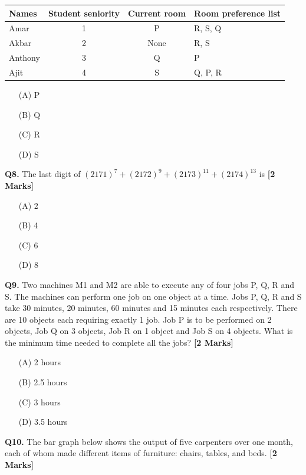 \documentclass[11pt]{article}
\newcommand{\questionb}[2]{
    \noindent\textbf{Q#2.} #1 \hfill \textbf{[2 Marks]}
}
\begin{document}
\begin{center}
\begin{tabular}{|l|c|c|l|}
\hline
Names & Student seniority & Current room & Room preference list \\
\hline
Amar & 1 & P & R, S, Q \\
Akbar & 2 & None & R, S \\
Anthony & 3 & Q & P \\
Ajit & 4 & S & Q, P, R \\
\hline
\end{tabular}
\end{center}

\begin{enumerate}
    \item[(A)] P  
    \item[(B)] Q  
    \item[(C)] R  
    \item[(D)] S  
\end{enumerate}
\vspace{0.5cm}

\questionb{The last digit of $(2171)^7 + (2172)^9 + (2173)^{11} + (2174)^{13}$ is}{8}
\begin{enumerate}
    \item[(A)] 2  
    \item[(B)] 4  
    \item[(C)] 6  
    \item[(D)] 8  
\end{enumerate}
\vspace{0.5cm}

\questionb{Two machines M1 and M2 are able to execute any of four jobs P, Q, R and S. The machines can perform one job on one object at a time. Jobs P, Q, R and S take 30 minutes, 20 minutes, 60 minutes and 15 minutes each respectively. There are 10 objects each requiring exactly 1 job. Job P is to be performed on 2 objects, Job Q on 3 objects, Job R on 1 object and Job S on 4 objects. What is the minimum time needed to complete all the jobs?}{9}
\begin{enumerate}
    \item[(A)] 2 hours  
    \item[(B)] 2.5 hours  
    \item[(C)] 3 hours  
    \item[(D)] 3.5 hours  
\end{enumerate}
\vspace{0.5cm}

\questionb{The bar graph below shows the output of five carpenters over one month, each of whom made different items of furniture: chairs, tables, and beds.}{10}
\end{document}
